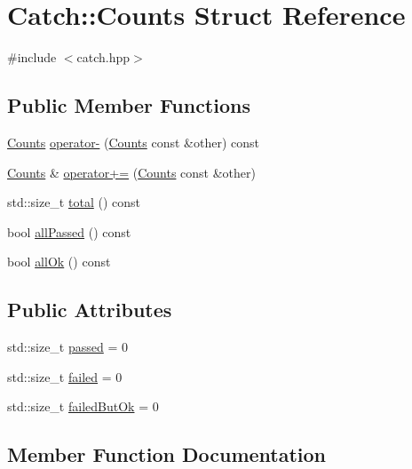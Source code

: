 \hypertarget{structCatch_1_1Counts}{}\section{Catch\+:\+:Counts Struct Reference}
\label{structCatch_1_1Counts}


{\ttfamily \#include $<$catch.\+hpp$>$}

\subsection*{Public Member Functions}
\begin{DoxyCompactItemize}
\item 
\mbox{\hyperlink{structCatch_1_1Counts}{Counts}} \mbox{\hyperlink{structCatch_1_1Counts_aaa10666f559057e3e860d2a5a6fae4c4}{operator-\/}} (\mbox{\hyperlink{structCatch_1_1Counts}{Counts}} const \&other) const
\item 
\mbox{\hyperlink{structCatch_1_1Counts}{Counts}} \& \mbox{\hyperlink{structCatch_1_1Counts_a322a89475cd2cc039140ef371e973677}{operator+=}} (\mbox{\hyperlink{structCatch_1_1Counts}{Counts}} const \&other)
\item 
std\+::size\+\_\+t \mbox{\hyperlink{structCatch_1_1Counts_a94f969c09cf52d1339c085c9603cd1d3}{total}} () const
\item 
bool \mbox{\hyperlink{structCatch_1_1Counts_a84999490e0ecaa3de5e121bf48eda1b3}{all\+Passed}} () const
\item 
bool \mbox{\hyperlink{structCatch_1_1Counts_a33bd996e016030155b99fe1c51c08991}{all\+Ok}} () const
\end{DoxyCompactItemize}
\subsection*{Public Attributes}
\begin{DoxyCompactItemize}
\item 
std\+::size\+\_\+t \mbox{\hyperlink{structCatch_1_1Counts_ad28daaf3de28006400208b6dd0c631e6}{passed}} = 0
\item 
std\+::size\+\_\+t \mbox{\hyperlink{structCatch_1_1Counts_a19982a3817a3bc2c07f0290e71f497a3}{failed}} = 0
\item 
std\+::size\+\_\+t \mbox{\hyperlink{structCatch_1_1Counts_ac090973a2ff51394cd452718e75c073e}{failed\+But\+Ok}} = 0
\end{DoxyCompactItemize}


\subsection{Member Function Documentation}
\mbox{\label{structCatch_1_1Counts_a33bd996e016030155b99fe1c51c08991}} 
